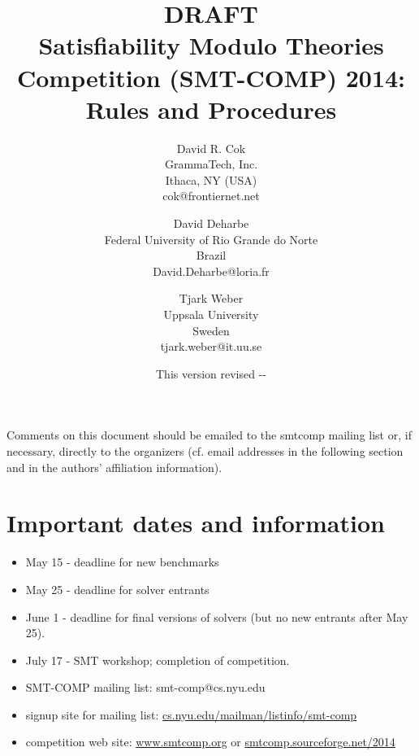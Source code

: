 \documentclass[12pt]{article}
\begin{document}
\date{\small This version revised \the\year-\the\month-\the\day}

\title{DRAFT\\Satisfiability Modulo Theories Competition (SMT-COMP) 2014: Rules and 
Procedures}


\def\doauthor#1{{%
  \hsize.5\hsize \advance\hsize by-1cm %
  \def\\{\hss\egroup\hbox to\hsize\bgroup\strut\hss}%
  \vbox{\hbox to\hsize\bgroup\strut\hss#1\hss\egroup}}}%

\def\header#1{\medskip\noindent\textbf{#1}}

\author{
David R. Cok \\
GrammaTech, Inc. \\
Ithaca, NY (USA) \\
cok@frontiernet.net \\
\and
David Deharbe \\
Federal University of Rio Grande do Norte \\
Brazil \\
David.Deharbe@loria.fr \\
\and
Tjark Weber \\
Uppsala University \\
Sweden \\
tjark.weber@it.uu.se \\ 
}



\maketitle

\def\eg{\textit{e.g.}}
\def\ie{\textit{i.e.}}

\noindent Comments on this document should be emailed to the smtcomp mailing
list or, if necessary, directly to the organizers (cf. email addresses in the following section and in the authors' affiliation information).

\section{Important dates and information}
\begin{itemize}
\item May 15 - deadline for new benchmarks
\item May 25 - deadline for solver entrants
\item June 1 - deadline for final versions of solvers (but no new entrants after May 25).
\item July 17 - SMT workshop; completion of competition.
\item SMT-COMP mailing list: smt-comp@cs.nyu.edu
\item signup site for mailing list: \url{cs.nyu.edu/mailman/listinfo/smt-comp}
\item competition web site: \url{www.smtcomp.org}  or \url{smtcomp.sourceforge.net/2014}
\end{itemize}
\end{document}
